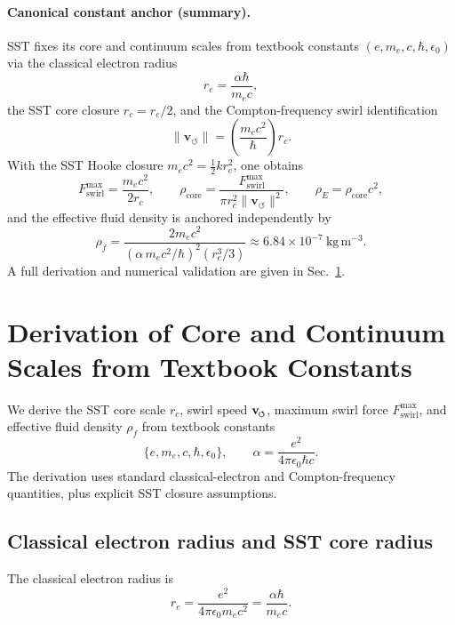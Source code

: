 \documentclass[11pt]{article}
\newcommand{\vswirl}{\mathbf{v}_{\mkern-2mu\scriptscriptstyle\boldsymbol{\circlearrowleft}}}
\newcommand{\rc}{r_c}                                    %
\begin{document}
    
    
    \paragraph{Canonical constant anchor (summary).}
        SST fixes its core and continuum scales from textbook constants \((e,m_e,c,\hbar,\epsilon_0)\) via the classical electron radius
        \[
            r_e=\frac{\alpha\hbar}{m_e c},
        \]
        the SST core closure \(\rc=r_e/2\), and the Compton-frequency swirl identification
        \[
            \lVert \mathbf{v}_{\!\boldsymbol{\circlearrowleft}}\rVert
            =
            \left(\frac{m_e c^2}{\hbar}\right)\rc.
        \]
        With the SST Hooke closure \(m_ec^2=\tfrac12 k r_e^2\), one obtains
        \[
            F_{\text{swirl}}^{\max}=\frac{m_e c^2}{2\rc},
            \qquad
            \rho_{\text{core}}=\frac{F_{\text{swirl}}^{\max}}{\pi \rc^2 \lVert \mathbf{v}_{\!\boldsymbol{\circlearrowleft}}\rVert^2},
            \qquad
            \rho_{\!E}=\rho_{\text{core}}c^2,
        \]
        and the effective fluid density is anchored independently by
        \[
            \rho_{\!f}=
            \frac{2 m_e c^2}{
                \left(\alpha \, m_e c^2/\hbar\right)^2 \left(r_e^3/3\right)}
            \approx 6.84\times 10^{-7}\ \mathrm{kg\,m^{-3}}.
        \]
        A full derivation and numerical validation are given in Sec.~\ref{sec:sst-first-principles-constants}.

    \section{Derivation of Core and Continuum Scales from Textbook Constants}
    \label{sec:sst-first-principles-constants}
    
    We derive the SST core scale \(\rc\), swirl speed \(\vswirl\), maximum swirl force \(F_{\text{swirl}}^{\max}\), and effective fluid density \(\rho_{\!f}\) from textbook constants
    \[
        \{e,m_e,c,\hbar,\epsilon_0\},
        \qquad
        \alpha = \frac{e^2}{4\pi \epsilon_0 \hbar c}.
    \]
    The derivation uses standard classical-electron and Compton-frequency quantities, plus explicit SST closure assumptions.
    
    \subsection{Classical electron radius and SST core radius}
        The classical electron radius is
        \begin{equation}
            r_e=\frac{e^2}{4\pi\epsilon_0 m_e c^2}
            =\frac{\alpha\hbar}{m_e c}.
            \label{eq:re-classical}
        \end{equation}
        
\end{document}
